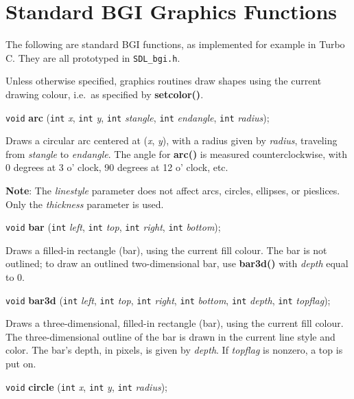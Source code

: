 \documentclass[a4paper,11pt]{article}
\newcommand{\V}{\texttt{void}}      %
\newcommand{\I}{\texttt{int}}       %
\newcommand{\func}[1]{\textbf{#1}}  %
\newcommand{\A}[1]{\emph{#1}}       %
\newcommand{\F}[1]{\texttt{#1}}     %
\newenvironment{bgi}
{ %
  \begin{snugshade}
}
{ %
  \end{snugshade}
}
\begin{document}

\section{Standard BGI Graphics Functions}

The following are standard BGI functions, as implemented for example
in Turbo C. They are all prototyped in \F{SDL\_bgi.h}.

Unless otherwise specified, graphics routines draw shapes using the
current drawing colour, i.e.\ as specified by \func{setcolor()}.


\begin{bgi}
  \V{} \func{arc} (\I{} \A{x}, \I{} \A{y}, \I{} \A{stangle}, \I{}
  \A{endangle}, \I{} \A{radius});
\end{bgi}

Draws a circular arc centered at (\A{x}, \A{y}), with a radius given
by \A{radius}, traveling from \A{stangle} to \A{endangle}. The angle
for \func{arc()} is measured counterclockwise, with 0 degrees at 3 o'
clock, 90 degrees at 12 o' clock, etc.

\textbf{Note}: The \A{linestyle} parameter does not affect arcs,
circles, ellipses, or pie\-slices. Only the \A{thickness} parameter is
used.


\begin{bgi}
\V{} \func{bar} (\I{} \A{left}, \I{} \A{top}, \I{} \A{right}, \I{}
\A{bottom});
\end{bgi}

Draws a filled-in rectangle (bar), using the current fill colour. The
bar is not outlined; to draw an outlined two-dimensional bar, use
\func{bar3d()} with \A{depth} equal to 0.


\begin{bgi}
\V{} \func{bar3d} (\I{} \A{left}, \I{} \A{top}, \I{} \A{right}, \I{}
\A{bottom}, \I{} \A{depth}, \I{} \A{topflag});
\end{bgi}

Draws a three-dimensional, filled-in rectangle (bar), using the
current fill colour. The three-dimensional outline of the bar is drawn
in the current line style and color. The bar's depth, in pixels, is
given by \A{depth}. If \A{topflag} is nonzero, a top is put on.


\begin{bgi}
\V{} \func{circle} (\I{} \A{x}, \I{} \A{y}, \I{} \A{radius});
\end{bgi}
\end{document}
